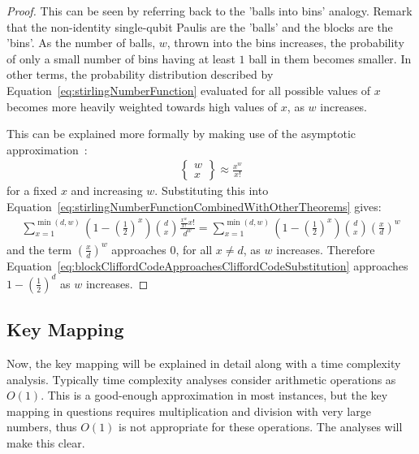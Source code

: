 \begin{proof}
This can be seen by referring back to the 'balls into bins' analogy. Remark that the non-identity single-qubit Paulis are the 'balls' and the blocks are the 'bins'. As the number of balls, $w$, thrown into the bins increases, the probability of only a small number of bins having at least $1$ ball in them becomes smaller. In other terms, the probability distribution described by Equation~\eqref{eq:stirlingNumberFunction} evaluated for all possible values of $x$ becomes more heavily weighted towards high values of $x$, as $w$ increases.

This can be explained more formally by making use of the asymptotic approximation~\cite{stirlingSecondKindApproximation}:
\begin{align}
\left\{\begin{smallmatrix}w\\x\end{smallmatrix}\right\} \approx \frac{x^w}{x!}
\end{align}
for a fixed $x$ and increasing $w$. Substituting this into Equation~\eqref{eq:stirlingNumberFunctionCombinedWithOtherTheorems} gives:
\begin{align}
\sum_{x=1} ^{\min(d,w)} \left(1-\left(\frac{1}{2}\right)^{x}\right) {d \choose x} \frac{\frac{x^w}{x!}x!}{d^w} = \sum_{x=1} ^{\min(d,w)} \left(1-\left(\frac{1}{2}\right)^{x}\right) {d \choose x} \left(\frac{x}{d}\right)^w \label{eq:blockCliffordCodeApproachesCliffordCodeSubstitution}
\end{align}
and the term $\left(\frac{x}{d}\right)^w$ approaches $0$, for all $x \neq d$, as $w$ increases. Therefore Equation~\eqref{eq:blockCliffordCodeApproachesCliffordCodeSubstitution} approaches $1 - \left(\frac{1}{2}\right)^d$ as $w$ increases.
\end{proof}

\subsection{Key Mapping}
\label{subsubsection:keyMappings}
Now, the key mapping will be explained in detail along with a time complexity analysis. Typically time complexity analyses consider arithmetic operations as $O\left(1\right)$. This is a good-enough approximation in most instances, but the key mapping in questions requires multiplication and division with very large numbers, thus $O\left(1\right)$ is not appropriate for these operations. The analyses will make this clear. 

